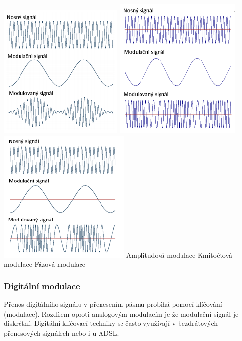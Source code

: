 \includegraphics[scale=0.62]{images/-016.png}
\includegraphics[scale=0.62]{images/-017.png}
\includegraphics[scale=0.62]{images/-018.png}
Amplitudová modulace \hspace{1.5cm} Kmitočtová modulace \hspace{1.5cm} Fázová modulace

\subsubsection{Digitální modulace}

Přenos digitálního signálu v přenesením pásmu probíhá pomocí klíčování (modulace). Rozdílem oproti analogovým modulacím je že modulační signál je diskrétní. Digitální klíčovací techniky se často využívají v bezdrátových přenosových signálech nebo i u ADSL.

